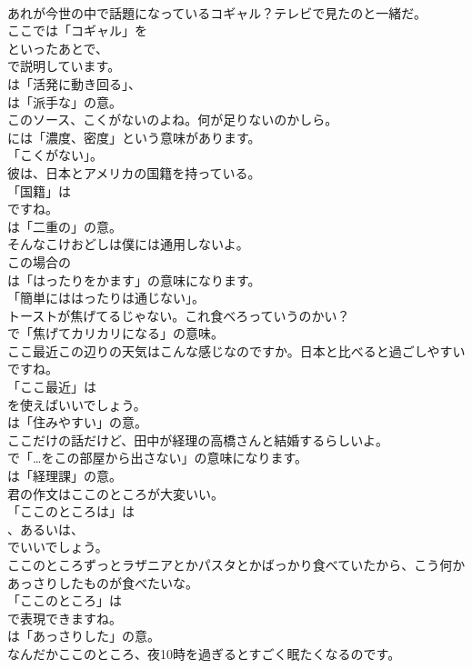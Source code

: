 \documentclass[8pt]{extreport}
\begin{document}
\begin{CJK}{UTF8}{min}
\\	あれが今世の中で話題になっているコギャル？テレビで見たのと一緒だ。 
\\	ここでは「コギャル」を 
\\	といったあとで、
\\	で説明しています。
\\	は「活発に動き回る」、
\\	は「派手な」の意。	
\\	このソース、こくがないのよね。何が足りないのかしら。 
\\	には「濃度、密度」という意味があります。
\\	「こくがない」。	
\\	彼は、日本とアメリカの国籍を持っている。 
\\	「国籍」は
\\	ですね。
\\	は「二重の」の意。	
\\	そんなこけおどしは僕には通用しないよ。 
\\	この場合の
\\	は「はったりをかます」の意味になります。
\\	「簡単にははったりは通じない」。	
\\	トーストが焦げてるじゃない。これ食べろっていうのかい？ 
\\	で「焦げてカリカリになる」の意味。	
\\	ここ最近この辺りの天気はこんな感じなのですか。日本と比べると過ごしやすいですね。 
\\	「ここ最近」は
\\	を使えばいいでしょう。
\\	は「住みやすい」の意。	
\\	ここだけの話だけど、田中が経理の高橋さんと結婚するらしいよ。 
\\	で「…をこの部屋から出さない」の意味になります。
\\	は「経理課」の意。	
\\	君の作文はここのところが大変いい。 
\\	「ここのところは」は
\\	、あるいは、
\\	でいいでしょう。	
\\	ここのところずっとラザニアとかパスタとかばっかり食べていたから、こう何かあっさりしたものが食べたいな。 
\\	「ここのところ」は 
\\	で表現できますね。
\\	は「あっさりした」の意。	
\\	なんだかここのところ、夜10時を過ぎるとすごく眠たくなるのです。 

\end{CJK}
\end{document}
